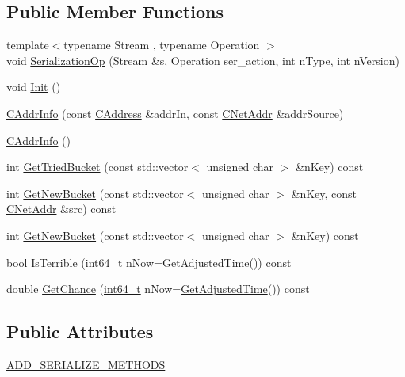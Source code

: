 \subsection*{Public Member Functions}
\begin{DoxyCompactItemize}
\item 
{\footnotesize template$<$typename Stream , typename Operation $>$ }\\void \hyperlink{class_c_addr_info_ae80fdec7d3b48278033ea2280f66e68b}{Serialization\+Op} (Stream \&s, Operation ser\+\_\+action, int n\+Type, int n\+Version)
\item 
void \hyperlink{class_c_addr_info_af1df1f12bc71ed7f3debae61058b9b9f}{Init} ()
\item 
\hyperlink{class_c_addr_info_a27e773233e8d7e7d183f138d24cc40ef}{C\+Addr\+Info} (const \hyperlink{class_c_address}{C\+Address} \&addr\+In, const \hyperlink{class_c_net_addr}{C\+Net\+Addr} \&addr\+Source)
\item 
\hyperlink{class_c_addr_info_ae14c3a91bb669e5580be1d3767264187}{C\+Addr\+Info} ()
\item 
int \hyperlink{class_c_addr_info_a3732720a8d657d1dc8163e896cc480b4}{Get\+Tried\+Bucket} (const std\+::vector$<$ unsigned char $>$ \&n\+Key) const 
\item 
int \hyperlink{class_c_addr_info_ae53c2174bdbc070bb1777cfabecaddda}{Get\+New\+Bucket} (const std\+::vector$<$ unsigned char $>$ \&n\+Key, const \hyperlink{class_c_net_addr}{C\+Net\+Addr} \&src) const 
\item 
int \hyperlink{class_c_addr_info_adf33262ab64918de67ac6c2175faab86}{Get\+New\+Bucket} (const std\+::vector$<$ unsigned char $>$ \&n\+Key) const 
\item 
bool \hyperlink{class_c_addr_info_a1fd74c1bd7a8eb3c234bf222f028e94c}{Is\+Terrible} (\hyperlink{stdint_8h_adec1df1b8b51cb32b77e5b86fff46471}{int64\+\_\+t} n\+Now=\hyperlink{timedata_8h_a09f81b9c7650f898cf3cf305b87547e6}{Get\+Adjusted\+Time}()) const 
\item 
double \hyperlink{class_c_addr_info_a264f9856d499cf077aa5c82327302307}{Get\+Chance} (\hyperlink{stdint_8h_adec1df1b8b51cb32b77e5b86fff46471}{int64\+\_\+t} n\+Now=\hyperlink{timedata_8h_a09f81b9c7650f898cf3cf305b87547e6}{Get\+Adjusted\+Time}()) const 
\end{DoxyCompactItemize}
\subsection*{Public Attributes}
\begin{DoxyCompactItemize}
\item 
\hyperlink{class_c_addr_info_a9d5e0b95fa494171e4bffb900094fe2e}{A\+D\+D\+\_\+\+S\+E\+R\+I\+A\+L\+I\+Z\+E\+\_\+\+M\+E\+T\+H\+O\+D\+S}
\end{DoxyCompactItemize}
